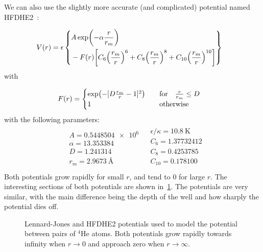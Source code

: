 \documentclass[Thesis.tex]{subfiles}
\begin{document}
We can also use the slightly more accurate (and complicated) potential named HFDHE2~\cite{Aziz-hfdhe2}:

\begin{align}
    \label{eq:HFDHE2-def}
    V(r) &= \epsilon
    \left\{\!\begin{aligned}
        &A \exp(-\alpha \frac{r }{ r_m})\\
        &- F(r) \qty[ C_6  \qty(\frac{r_m }{ r})^6 + C_8  \qty(\frac{r_m }{ r})^8 + C_{10} \qty(\frac{r_m }{ r})^{10}]
    \end{aligned}\right\}
\end{align}
with

\begin{align}
    F(r) &= \begin{cases}
        \exp( - [D \frac{r_m}{r} -  1]^2 ) & \qfor \frac{r}{r_m} \leq D\\
        1 & \qotherwise
    \end{cases}
\end{align}
with the following parameters:
\begin{align}\label{eq:HFDHE2-parameters}
    \begin{split}
        &A = \num{0.5448504e6}\\
        &\alpha = \num{13.353384}\\
        &D = \num{1.241314}\\
        &r_m= \SI{2.9673}{\angstrom}
    \end{split}
    \begin{split}
        &\epsilon/\kappa = \SI{10.8}{\K}\\
        &C_6= \num{1.37732412}\\
        &C_8= \num{0.4253785}\\
        &C_{10}= \num{0.178100}\\
    \end{split}
\end{align}
Both potentials grow rapidly for small $r$, and tend to $0$ for large $r$. The
interesting sections of both potentials are shown
in~\cref{fig:helium-potentials-plot}. The potentials are very similar, with the
main difference being the depth of the well and how sharply the potential dies
off.

\begin{figure}[h]
  \centering
  
  \caption[Lennard-Jones and HFDHE2 potentials]{Lennard-Jones and HFDHE2 potentials used to model the potential
    between pairs of $^4$He atoms. Both potentials grow rapidly towards infinity
  when $r\to0$ and approach zero when $r\to\infty$.}
  \label{fig:helium-potentials-plot}
\end{figure}
\end{document}
